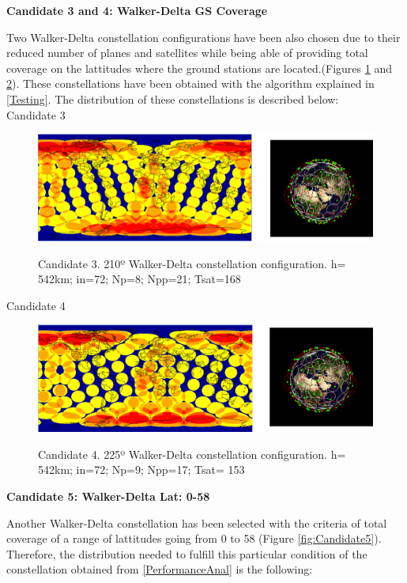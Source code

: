\textbf{Candidate 3 and 4: Walker-Delta GS Coverage}

Two Walker-Delta constellation configurations have been also chosen due to their reduced number of planes and satellites while being able of providing total coverage on the lattitudes where the ground stations are located.(Figures \ref{fig:Candidate3} and \ref{fig:Candidate4}).
These constellations have been obtained with the algorithm explained in \ref{Testing}. The distribution of these constellations is described below:\\

Candidate 3

\begin{figure}%
	\centering
	\includegraphics[width=1\textwidth]{Candidate3.png}\\
	\caption{Candidate 3. 210º Walker-Delta constellation configuration.
			 h= 542km; in=72; Np=8; Npp=21; Tsat=168 }
	\label{fig:Candidate3}
\end{figure}


Candidate 4

\begin{figure}%
	\centering
	\includegraphics[width=1\textwidth]{Candidate4.png}\\
	\caption{Candidate 4. 225º Walker-Delta constellation configuration.
			 h= 542km; in=72; Np=9; Npp=17; Tsat= 153}
	\label{fig:Candidate4}
\end{figure}

\textbf{Candidate 5: Walker-Delta Lat: 0-58}

Another Walker-Delta constellation has been selected with the criteria of total coverage of a range of lattitudes going from 0 to 58 (Figure \ref{fig:Candidate5}). Therefore, the distribution needed to fulfill this particular condition of the constellation obtained from \ref{PerformanceAnal} is the following:

